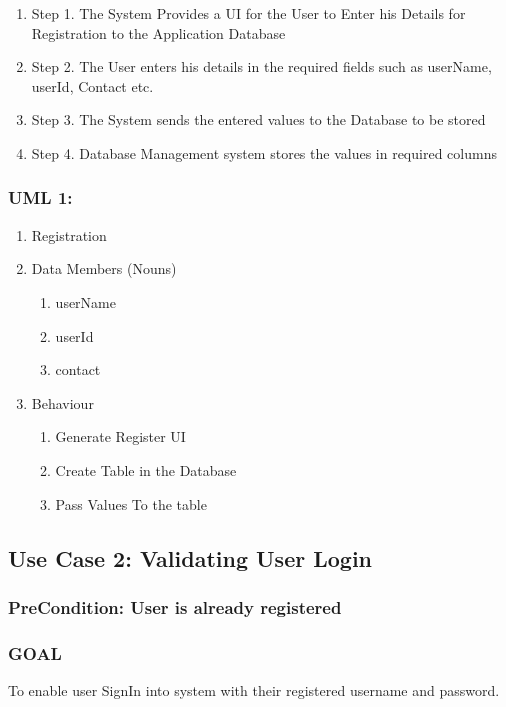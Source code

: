 \documentclass{article}
\begin{document}
\begin{enumerate}
    \item  Step 1. The System Provides a UI for the User to Enter his Details for Registration to the Application Database
    \item  Step 2. The User enters his details in the required fields such as userName, userId, Contact etc.
    \item  Step 3. The System sends the entered values to the Database to be stored
    \item  Step 4. Database Management system stores the values in required columns

\end{enumerate}

\subsubsection{UML 1:}
\begin{enumerate}
    \item Registration
    \item Data Members (Nouns)
          \begin{enumerate}
              \item userName
              \item userId
              \item contact
          \end{enumerate}
    \item Behaviour
        \begin{enumerate}
            \item Generate Register UI
            \item Create Table in the Database
            \item Pass Values To the table
        \end{enumerate}
\end{enumerate}

\subsection{Use Case 2: Validating User Login}
\subsubsection{PreCondition: User is already registered}
\subsubsection{GOAL}
To enable user SignIn into system with their registered username and password.
\end{document}
